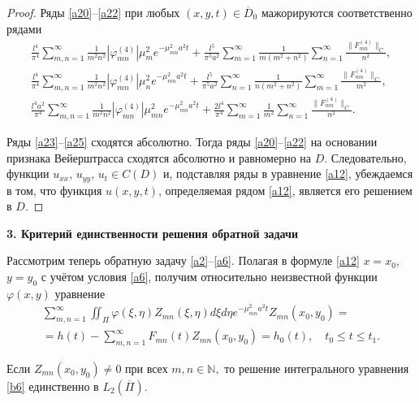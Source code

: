 \begin{proof}
Ряды \eqref{a20}--\eqref{a22} при любых $(x,y,t)\in \overline{D}_0$ мажорируются соответственно рядами
\begin{gather}
\label{a23}\frac{l^4}{\pi^4}\sum_{m,n=1}^{\infty}\frac{1}{m^2n^2}|\varphi^{(4)}_{mn}|\mu_{m}^2e^{-\mu_{mn}^2a^2t}+\frac{l^5}{\pi^5a^2}\sum_{m=1}^\infty\frac{1}{m(m^2+n^2)}
\sum_{n=1}^{\infty}\frac{\|F^{(4)}_{mn}\|_C}{n^2},
\\
\label{a25}
\frac{l^4}{\pi^4}\sum_{m,n=1}^{\infty}\frac{1}{m^2n^2}|\varphi^{(4)}_{mn}|\mu_{n}^2e^{-\mu_{mn}^2a^2t}+\frac{l^5}{\pi^5a^2}\sum_{n=1}^\infty\frac{1}{n(m^2+n^2)}
\sum_{m=1}^{\infty}\frac{\|F^{(4)}_{mn}\|_C}{m^2},
\\
\label{a25}\frac{l^4a^2}{\pi^4}\sum_{m,n=1}^{\infty}\frac{1}{m^2n^2}|\varphi^{(4)}_{mn}|\mu_{mn}^2e^{-\mu_{mn}^2a^2t}+\frac{2l^4}{\pi^4}
\sum_{m=1}^{\infty}\frac{1}{m^2}\sum_{n=1}^{\infty}\frac{\|F^{(4)}_{mn}\|_C}{n^2}.
\end{gather}

Ряды \eqref{a23}--\eqref{a25} сходятся абсолютно. 
Тогда ряды \eqref{a20}--\eqref{a22} на основании признака Вейерштрасса сходятся абсолютно и равномерно на $D$. 
Следовательно, функции $u_{xx}$, $u_{yy}$, $u_t\in C(D)$ и, подставляя ряды в уравнение \eqref{a12}, убеждаемся в том, что функция $u(x,y,t)$, определяемая рядом \eqref{a12}, является его решением в $D.$ 
\end{proof}

\smallskip

{\bf 3. Критерий единственности решения обратной задачи}

Рассмотрим теперь обратную задачу \eqref{a2}--\eqref{a6}. 
Полагая в формуле \eqref{a12} \linebreak ${x=x_0}$, $y=y_0$ с учётом условия \eqref{a6}, получим относительно неизвестной функции $\varphi(x,y)$ уравнение
\begin{multline}
\label{b6}\sum_{m,n=1}^{\infty}\iint_{\Pi}\varphi(\xi,\eta)Z_{mn}(\xi,\eta)d\xi d\eta e^{-\mu_{mn}^2a^2t}Z_{mn}(x_0,y_0)=
\\
=h(t)-\sum_{m,n=1}^{\infty}F_{mn}(t)Z_{mn}(x_0,y_0)=h_0(t),\quad  t_0\leqslant t\leqslant t_1.
\end{multline}

\smallskip

\hypertarget{zay:th3}{}

\begin{theorem}[3] \label{t22}
Если $Z_{mn}(x_0,y_0)\neq 0$ при всех $m,n\in \mathbb{N},$
то решение интегрального уравнения \eqref{b6} единственно в $L_2(\overline{\Pi})$\rm.
\end{theorem}


